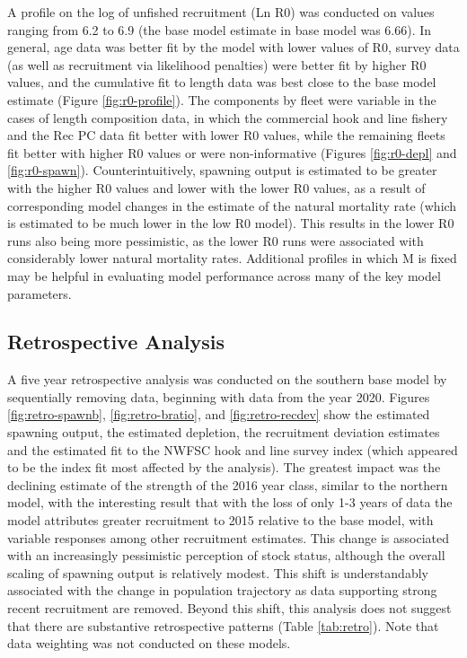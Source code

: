 \documentclass[
  english,
  a4paper,
]{article}
\begin{document}
A profile on the log of unfished recruitment (Ln R0) was conducted on values ranging from 6.2 to 6.9 (the base model estimate in base model was 6.66). In general, age data was better fit by the model with lower values of R0, survey data (as well as recruitment via likelihood penalties) were better fit by higher R0 values, and the cumulative fit to length data was best close to the base model estimate (Figure \ref{fig:r0-profile}). The components by fleet were variable in the cases of length composition data, in which the commercial hook and line fishery and the Rec PC data fit better with lower R0 values, while the remaining fleets fit better with higher R0 values or were non-informative (Figures \ref{fig:r0-depl} and \ref{fig:r0-spawn}). Counterintuitively, spawning output is estimated to be greater with the higher R0 values and lower with the lower R0 values, as a result of corresponding model changes in the estimate of the natural mortality rate (which is estimated to be much lower in the low R0 model). This results in the lower R0 runs also being more pessimistic, as the lower R0 runs were associated with considerably lower natural mortality rates. Additional profiles in which M is fixed may be helpful in evaluating model performance across many of the key model parameters.

\hypertarget{retrospective-analysis}{%
\subsection{Retrospective Analysis}\label{retrospective-analysis}}

A five year retrospective analysis was conducted on the southern base model by sequentially removing data, beginning with data from the year 2020. Figures \ref{fig:retro-spawnb}, \ref{fig:retro-bratio}, and \ref{fig:retro-recdev} show the estimated spawning output, the estimated depletion, the recruitment deviation estimates and the estimated fit to the NWFSC hook and line survey index (which appeared to be the index fit most affected by the analysis). The greatest impact was the declining estimate of the strength of the 2016 year class, similar to the northern model, with the interesting result that with the loss of only 1-3 years of data the model attributes greater recruitment to 2015 relative to the base model, with variable responses among other recruitment estimates. This change is associated with an increasingly pessimistic perception of stock status, although the overall scaling of spawning output is relatively modest. This shift is understandably associated with the change in population trajectory as data supporting strong recent recruitment are removed. Beyond this shift, this analysis does not suggest that there are substantive retrospective patterns (Table \ref{tab:retro}). Note that data weighting was not conducted on these models.
\end{document}

